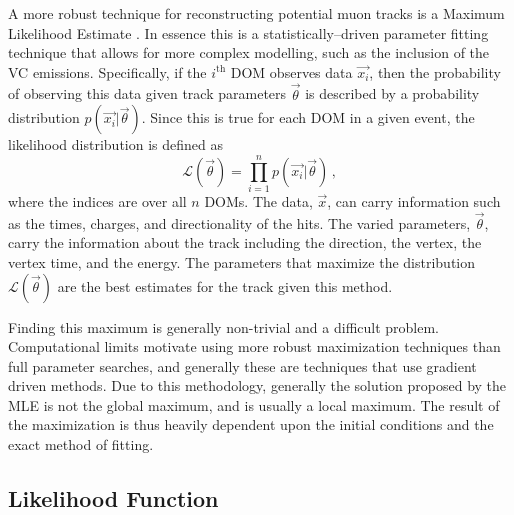 A more robust technique for reconstructing potential muon tracks is a Maximum Likelihood Estimate \cite{llh_text}. In essence this is a statistically--driven parameter fitting technique that allows for more complex modelling, such as the inclusion of the VC emissions. Specifically, if the $i^{\text{th}}$ DOM observes data $\vec{x_{i}}$, then the probability of observing this data given track parameters $\vec{\theta}$ is described by a probability distribution $p\left(\vec{x_{i}}\bigr\rvert\vec{\theta}\right)$. Since this is true for each DOM in a given event, the likelihood distribution is defined as
\begin{equation}\label{eq:gen_llh}
  \mathcal{L}(\vec{\theta}) = \prod_{i=1}^{n}p\left(\vec{x_{i}}\bigr\rvert\vec{\theta}\right)\, ,
\end{equation}
where the indices are over all $n$ DOMs. The data, $\vec{x}$, can carry information such as the times, charges, and directionality of the hits. The varied parameters, $\vec{\theta}$, carry the information about the track including the direction, the vertex, the vertex time, and the energy. The parameters that maximize the distribution $\mathcal{L}(\vec{\theta})$ are the best estimates for the track given this method.

Finding this maximum is generally non-trivial and a difficult problem. Computational limits motivate using more robust maximization techniques than full parameter searches, and generally these are techniques that use gradient driven methods. Due to this methodology, generally the solution proposed by the MLE is not the global maximum, and is usually a local maximum. The result of the maximization is thus heavily dependent upon the initial conditions and the exact method of fitting.

\subsection{Likelihood Function}

